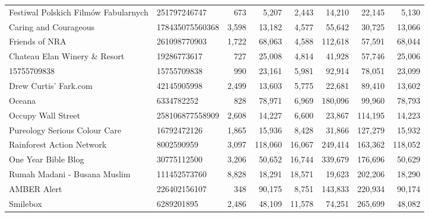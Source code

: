 \begin{longtable}{llrrrrrr}
              Festiwal Polskich Filmów Fabularnych &     251797246747 &     673 &       5,207 &      2,443 &      14,210 &        22,145 &      5,130 \\
                             Caring and Courageous &  178435075560368 &   3,598 &      13,182 &      4,577 &      55,642 &        30,725 &     13,066 \\
                                    Friends of NRA &     261098770903 &   1,722 &      68,063 &      4,588 &     112,618 &        57,591 &     68,044 \\
                     Chateau Elan Winery \& Resort &      19286773617 &     727 &      25,008 &      4,814 &      41,928 &        57,746 &     25,006 \\
                                       15755709838 &      15755709838 &     990 &      23,161 &      5,981 &      92,914 &        78,051 &     23,099 \\
                             Drew Curtis' Fark.com &      42145905998 &   2,499 &      13,603 &      5,775 &      22,681 &        89,410 &     13,602 \\
                                            Oceana &       6334782252 &     828 &      78,971 &      6,969 &     180,096 &        99,960 &     78,793 \\
                                Occupy Wall Street &  258106877558909 &   2,608 &      14,227 &      6,600 &      23,867 &       114,195 &     14,223 \\
                     Pureology Serious Colour Care &      16792472126 &   1,865 &      15,936 &      8,428 &      31,866 &       127,279 &     15,932 \\
                         Rainforest Action Network &       8002590959 &   3,097 &     118,060 &     16,067 &     249,414 &       163,362 &    118,052 \\
                               One Year Bible Blog &      30775112500 &   3,206 &      50,652 &     16,744 &     339,679 &       176,696 &     50,629 \\
                      Rumah Madani - Busana Muslim &     111452573760 &   8,828 &      18,291 &     18,571 &      19,623 &       202,206 &     18,290 \\
                                       AMBER Alert &     226402156107 &     348 &      90,175 &      8,751 &     143,833 &       220,934 &     90,174 \\
                                          Smilebox &       6289201895 &   2,486 &      48,109 &     11,578 &      74,251 &       265,699 &     48,082 \\

\end{longtable}
